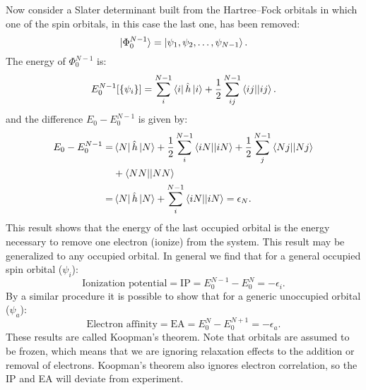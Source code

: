 \documentclass[../Main/chem532-notes.tex]{subfiles}
\begin{document}
Now consider a Slater determinant built from the Hartree--Fock orbitals in which one of the spin orbitals, in this case the last one, has been removed:
\begin{equation}
\ket{\Phi_0^{N-1}} = \ket{\psi_1, \psi_2, \ldots, \psi_{N-1} }.
\end{equation}
The energy of $\Phi_0^{N-1}$ is:
\begin{equation}
E_0^{N-1}[\{ \psi_i \}] = \sum_i^{N-1} \bra{i} \hat{h} \ket{i} + \frac{1}{2} \sum_{ij}^{N-1} \bra{ij}\!\ket{ij}.
\end{equation}
and the difference $E_0 - E_0^{N-1}$ is given by:
\begin{equation}
\begin{split}
E_0 - E_0^{N-1} =& \bra{N} \hat{h} \ket{N} + \frac{1}{2} \sum_{i}^{N-1} \bra{iN}\!\ket{iN}
+ \frac{1}{2} \sum_{j}^{N-1} \bra{Nj}\!\ket{Nj}\\
&+ \bra{NN}\!\ket{NN} \\
=& \bra{N} \hat{h} \ket{N} + \sum_{i}^{N-1} \bra{iN}\!\ket{iN} = \epsilon_N.
\end{split}
\end{equation}
This result shows that the energy of the last occupied orbital is the energy necessary to remove one electron (ionize) from the system.
This result may be generalized to any occupied orbital. In general we find that for a general occupied spin orbital ($\psi_i$):
\begin{equation}
\text{Ionization potential} = \mathrm{IP} = E_0^{N-1} - E_0^{N} = -\epsilon_i.
\end{equation}
By a similar procedure it is possible to show that for a generic unoccupied orbital ($\psi_a$):
\begin{equation}
\text{Electron affinity} = \mathrm{EA} = E_0^{N} - E_0^{N+1} = -\epsilon_a.
\end{equation}
These results are called Koopman's theorem.
Note that orbitals are assumed to be frozen, which means that we are ignoring relaxation effects to the addition or removal of electrons.
Koopman's theorem also ignores electron correlation, so the IP and EA will deviate from experiment.
\end{document}
